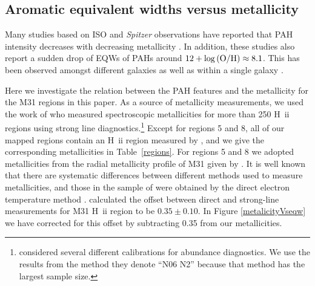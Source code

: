 \subsection{Aromatic equivalent widths versus metallicity}
\label{sect:eqw_met}

Many studies based on ISO and {\em Spitzer} observations have reported that PAH intensity decreases with decreasing metallicity \citep{Calzetti:2010fk}. 
In addition, these studies also report a sudden drop of EQWs of PAHs around $12+\log{\rm (O/H)} \approx 8.1$. 
This has been observed amongst different galaxies \citep{Engelbracht_2008} as well as within a single galaxy \citep{Gordon:2008lr}. 

Here we investigate the relation between the PAH features and the metallicity for the M31 regions in this paper. 
As a source of metallicity measurements, we used the work of \citet{Sanders_2011} who measured spectroscopic metallicities for
more than 250 H~{\sc ii} regions using strong line diagnostics.\footnote{\citet{Sanders_2011} considered several different
calibrations for abundance diagnostics. We use the results from the method they denote ``N06 N2''  \citep{Nagao2006} because
that method has the largest sample size.} Except for regions 5 and 8, all of our mapped regions contain an  H~{\sc ii} region measured by
 \citet{Sanders_2011}, and we give the corresponding metallicities in Table~\ref{regions}.
 For regions 5 and 8 we adopted metallicities from the radial metallicity profile of M31 given by
 \citet{Sanders_2011}. It is well known that there are systematic differences between different 
 methods used to measure metallicities, and those in the sample of \citet{Engelbracht_2008} 
 were obtained by the direct electron temperature method  \citep{Skillman1998}.
\citet{Mitchel2014} calculated the offset between direct and strong-line measurements for M31 H~{\sc ii} region to be 
$0.35\pm0.10$. In Figure \ref{metalicityVseqw} we have corrected for this offset  by subtracting 0.35 from our metallicities. 


